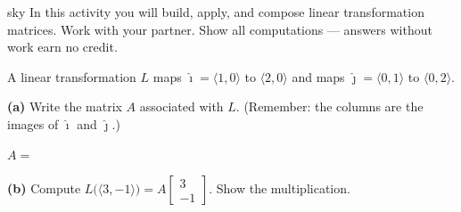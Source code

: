 \documentclass[10pt]{article}
\begin{document}
\namepartnerperiod

\vspace{0.08in}

\begin{scenariobox}{sky}
\small
In this activity you will build, apply, and compose linear transformation matrices.
Work with your partner. Show all computations --- answers without work earn no credit.
\end{scenariobox}

\vspace{0.08in}

\begin{tcolorbox}[colback=white, colframe=black!40,
    title=\textbf{Tier R --- Reading the Transformation Matrix},
    fonttitle=\bfseries, arc=2mm, left=3mm, right=3mm, top=2mm, bottom=2mm]
\small

A linear transformation $L$ maps $\hat{\imath}=\langle1,0\rangle$ to $\langle2,0\rangle$
and maps $\hat{\jmath}=\langle0,1\rangle$ to $\langle0,2\rangle$.

\vspace{0.08in}
\textbf{(a)} Write the matrix $A$ associated with $L$.
(Remember: the columns are the images of $\hat{\imath}$ and $\hat{\jmath}$.)

\vspace{0.06in}
\hspace{1em}
$A = $ 

\vspace{0.12in}
\textbf{(b)} Compute $L\bigl(\langle3,-1\rangle\bigr) = A\begin{bmatrix}3\\-1\end{bmatrix}$.
Show the multiplication.

\vspace{0.06in}


\end{tcolorbox}
\end{document}
